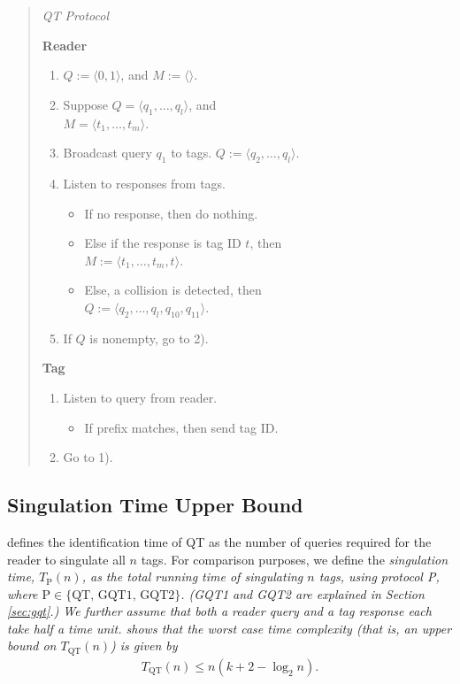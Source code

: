 \documentclass[conference]{IEEEtran}
\begin{document}
\begin{quote}
\em QT Protocol \em \\
\begin{footnotesize}
\textbf{Reader}
\begin{enumerate}
\item $Q:=\langle0,1\rangle$, and $M:=\langle \rangle$.
\item Suppose $Q = \langle q_1, \ldots, q_l \rangle$, and \\$M = \langle t_1, \ldots, t_m\rangle$.
\item Broadcast query $q_1$ to tags.   $Q := \langle q_2, \ldots, q_l \rangle$.
\item Listen to responses from tags.
\begin{itemize}
\item If no response, then do nothing.
\item Else if the response is tag ID $t$, then \\$M := \langle t_1, \ldots, t_m, t\rangle$.
\item Else, a collision is detected, then \\$Q := \langle q_2, \ldots, q_l, q_10, q_11 \rangle$.
\end{itemize}
\item If $Q$ is nonempty, go to 2).
\end{enumerate}
\textbf{Tag}
\begin{enumerate}
\item Listen to query from reader.
\begin{itemize}
\item If prefix matches, then send tag ID.
\end{itemize}
\item Go to 1).
\end{enumerate}
\end{footnotesize}
\end{quote}
\subsection{Singulation Time Upper Bound}
\cite{conf:Law01} defines the identification time of QT as the number of queries required for the reader to singulate all $n$ tags.  For comparison purposes, we define the \em singulation time\em, $T_{\mbox{P}} \left(n\right)$, as the total running time of singulating $n$ tags, using protocol P, where $\mbox{P} \in \{\mbox{QT, GQT1, GQT2}\}$.  (GQT1 and GQT2 are explained in Section \ref{sec:gqt}.)  We further assume that both a reader query and a tag response each take half a time unit.  \cite{conf:Law01} shows that the worst case time complexity (that is, an upper bound on $T_{\mbox{QT}}\left(n\right)$) is given by
\begin{eqnarray}
T_{\mbox{QT}}\left(n\right) \leq n \left( k + 2 - \log_2 n\right).
\label{eqn:t_qt}
\end{eqnarray}
\end{document}
